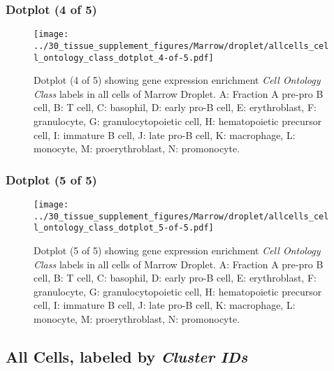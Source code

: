 \clearpage

\subsubsection{Dotplot (4 of 5)}
\begin{figure}[h]
\centering
\texttt{[image: ../30\_tissue\_supplement\_figures/Marrow/droplet/allcells\_cell\_ontology\_class\_dotplot\_4-of-5.pdf]}

\caption{ Dotplot (4 of 5)  showing gene expression enrichment \emph{Cell Ontology Class} labels in all cells of Marrow Droplet. A: Fraction A pre-pro B cell, B: T cell, C: basophil, D: early pro-B cell, E: erythroblast, F: granulocyte, G: granulocytopoietic cell, H: hematopoietic precursor cell, I: immature B cell, J: late pro-B cell, K: macrophage, L: monocyte, M: proerythroblast, N: promonocyte.}
\end{figure}


\clearpage

\subsubsection{Dotplot (5 of 5)}
\begin{figure}[h]
\centering
\texttt{[image: ../30\_tissue\_supplement\_figures/Marrow/droplet/allcells\_cell\_ontology\_class\_dotplot\_5-of-5.pdf]}

\caption{ Dotplot (5 of 5)  showing gene expression enrichment \emph{Cell Ontology Class} labels in all cells of Marrow Droplet. A: Fraction A pre-pro B cell, B: T cell, C: basophil, D: early pro-B cell, E: erythroblast, F: granulocyte, G: granulocytopoietic cell, H: hematopoietic precursor cell, I: immature B cell, J: late pro-B cell, K: macrophage, L: monocyte, M: proerythroblast, N: promonocyte.}
\end{figure}


\clearpage

\subsection{All Cells, labeled by \emph{Cluster IDs}}
